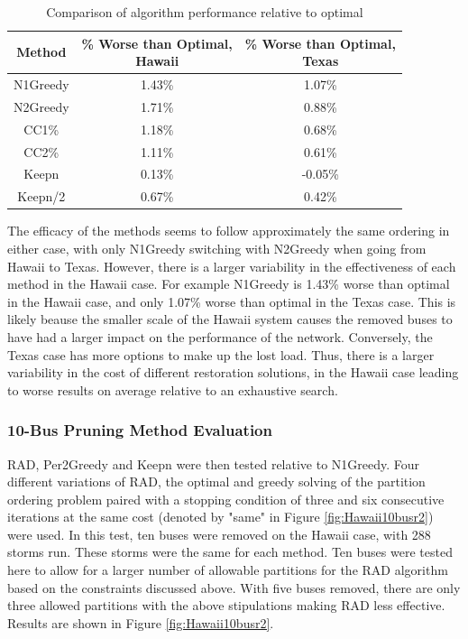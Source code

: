\documentclass[12pt]{article}
\begin{document}
\begin{table}[ht]
    \centering
    \renewcommand{\arraystretch}{1.2} %
    \begin{tabular}{|c|c|c|}
        \hline
        \textbf{Method} & \makecell{\% Worse than Optimal, \\ Hawaii} & \makecell{\% Worse than Optimal, \\ Texas} \\
        \hline
        N1Greedy & 1.43\% & 1.07\% \\
        \hline
        N2Greedy & 1.71\% & 0.88\% \\
        \hline
        CC1\% & 1.18\% & 0.68\% \\
        \hline
        CC2\% & 1.11\% & 0.61\% \\
        \hline
        Keepn & 0.13\% & -0.05\% \\
        \hline
        Keepn/2 & 0.67\% & 0.42\% \\
        \hline
    \end{tabular}
    \caption{Comparison of algorithm performance relative to optimal}
    \label{tab:r1results}
\end{table}

The efficacy of the methods seems to follow approximately the same ordering in either case, with only N1Greedy switching with N2Greedy when going from Hawaii to Texas. However, there is a larger variability in the effectiveness of each method in the Hawaii case. For example N1Greedy is 1.43\% worse than optimal in the Hawaii case, and only 1.07\% worse than optimal in the Texas case. This is likely beause the smaller scale of the Hawaii system causes the removed buses to have had a larger impact on the performance of the network. Conversely, the Texas case has more options to make up the lost load. Thus, there is a larger variability in the cost of different restoration solutions, in the Hawaii case leading to worse results on average relative to an exhaustive search. \par

\subsubsection{10-Bus Pruning Method Evaluation}
RAD, Per2Greedy and Keepn were then tested relative to N1Greedy. Four different variations of RAD, the optimal and greedy solving of the partition ordering problem paired with a stopping condition of three and six consecutive iterations at the same cost (denoted by "same" in Figure \ref{fig:Hawaii10busr2}) were used. In this test, ten buses were removed on the Hawaii case, with 288 storms run. These storms were the same for each method. Ten buses were tested here to allow for a larger number of allowable partitions for the RAD algorithm based on the constraints discussed above. With five buses removed, there are only three allowed partitions with the above stipulations making RAD less effective. Results are shown in Figure \ref{fig:Hawaii10busr2}.
\end{document}
